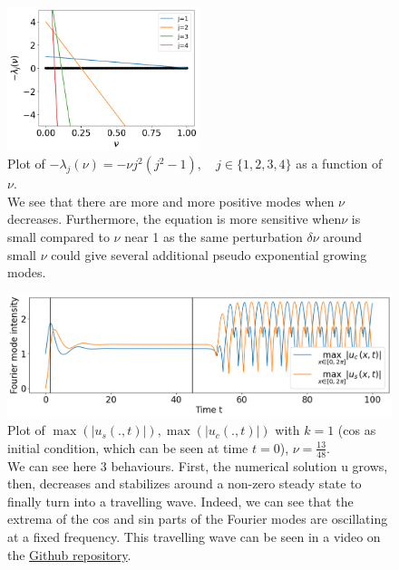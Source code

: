 \documentclass[12pt]{article}
\begin{document}
\begin{figure}[h]
\centering
\includegraphics[width=0.5\textwidth]{KS_eq/plot_lambda_nu.png}
\caption{Plot of $-\lambda_j(\nu) = -\nu j^2(j^2-1), \quad j\in \{1, 2, 3, 4\}$ as a function of $\nu.$\\ We see that there are more and more positive modes when $\nu$ decreases. Furthermore, the equation is more sensitive
 when$\nu$  is small compared to $\nu$ near 1 as the same perturbation $\delta \nu$ around small $\nu$ could give several 
 additional pseudo exponential growing modes.   }
\label{fig:KS_eq_nu_inf_1}
\end{figure}


\begin{figure}[h]
\centering
\includegraphics[width=1\textwidth]{KS_eq/KS_extrema_Fourier_coef.png}
\caption{Plot of $\max(|u_s(.,t)|), \max(|u_c(.,t)|)$ with $k=1$ (cos as initial condition, which can be seen at time $t=0$), $\nu = \frac{13}{48}$. \\
 We can see here 3 behaviours. First, the numerical solution u grows, then, decreases and stabilizes around a non-zero steady state to finally
 turn into a travelling wave. Indeed, we can see that the extrema of the cos and sin parts of the Fourier modes are oscillating at a fixed frequency.
 This travelling wave can be seen in a video on the \href{https://github.com/Bilal59170/Repo_Warwick_internship}{Github repository}.}
\label{fig:KS_eq_nu_inf_1_prog_wave}
\end{figure}
\end{document}
